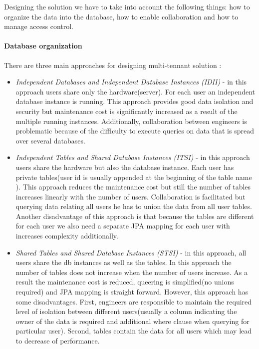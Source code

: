 \documentclass[a4paper, notitlepage]{article}
\begin{document}
Designing the solution we have to take into account the following things: how to organize the data into the database, how to enable collaboration and how to manage access control.

\paragraph{Database organization}
There are three main approaches for designing multi-tennant solution \cite{Hui}:

\begin{itemize}
	\item \textit{Independent Databases and Independent Database Instances (IDII)} - in this approach users share only the hardware(server). For each user an independent database instance is running. This approach provides good data isolation and security but maintenance cost is significantly increased as a result of the multiple running instances. Additionally, collaboration between engineers is problematic because of the difficulty to execute queries on data that is spread over several databases.  
	
	\item \textit{Independent Tables and Shared Database Instances (ITSI)} - in this approach users share the hardware but also the database instance. Each user has private tables(user id is usually appended at the beginning of the table name \cite{Hui}). This approach reduces the maintenance cost but still the number of tables increases linearly with the number of users. Collaboration is facilitated but querying data relating all users he has to union the data from all user tables. Another disadvantage of this approach is that because the tables are different for each user we also need a separate JPA mapping for each user with increases complexity additionally.
	
	\item \textit{Shared Tables and Shared Database Instances (STSI)} - in this approach, all users share the db instances as well as the tables. In this approach the number of tables does not increase when the number of users increase. As a result the maintenance cost is reduced, queering is simplified(no unions required) and JPA mapping is straight forward. However, this approach has some disadvantages. First, engineers are responsible to maintain the required level of isolation between different users(usually a column indicating the owner of the data is required and additional where clause when querying for particular user). Second, tables contain the data for all users which may lead to decrease of performance.
	
\end{itemize}
\end{document}
